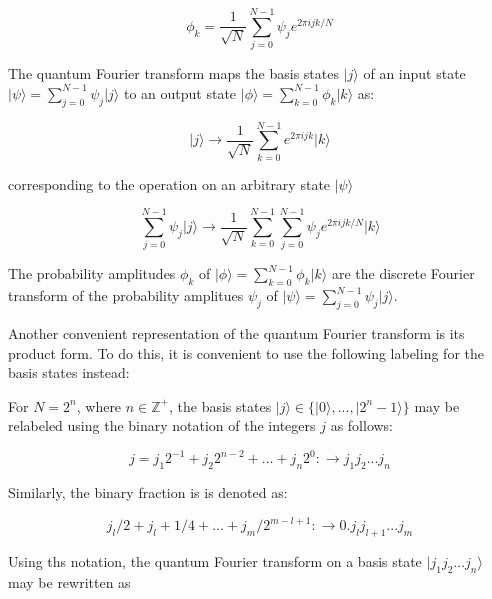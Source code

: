 \documentclass{article}
\begin{document}
\begin{equation}
\phi_k = \frac{1}{\sqrt{N}}  \sum_{j=0}^{N-1} \psi_j e^{2 \pi i j k / N }
\end{equation}

The quantum Fourier transform maps the basis states $\lvert j \rangle$ of an input state $\lvert \psi \rangle = \sum_{j=0}^{N-1} \psi_j \lvert j \rangle $ to an output state  $\lvert \phi \rangle = \sum_{k=0}^{N-1} \phi_k \lvert k \rangle $  as:

\begin{equation}
\lvert j \rangle \rightarrow \frac{1}{\sqrt{N}} \sum_{k=0}^{N-1} e^{2 \pi i j k } \lvert k \rangle
\end{equation}

corresponding to the operation on an arbitrary state $\lvert \psi \rangle$

\begin{equation}
\sum_{j=0}^{N-1} \psi_j \lvert j \rangle \rightarrow   \frac{1}{\sqrt{N}}  \sum_{k=0}^{N-1} \sum_{j=0}^{N-1} \psi_j e^{2 \pi i j k / N } |k\rangle
\end{equation}

The probability amplitudes $\phi_k$ of $ \lvert \phi \rangle = \sum_{k=0}^{N-1} \phi_k \lvert k \rangle$  are the discrete Fourier transform of the probability amplitues $\psi_j$ of $ \lvert \psi \rangle = \sum_{j=0}^{N-1} \psi_j \lvert j \rangle$.



Another convenient representation of the quantum Fourier transform is its product form. To do this, it is convenient to use the following labeling for the basis states instead:

For $N=2^n$, where $n\in \mathbb{Z}^+$, the basis states $ \lvert j \rangle \in \{ \lvert 0 \rangle , ... , \lvert 2^n - 1\rangle \}$  may be relabeled using the binary notation of the integers $j$ as follows:

\begin{equation}
j = j_1 2^{-1} + j_2 2^{n-2} + ... + j_n 2^{0} : \rightarrow j_1 j_2 ... j_n
\end{equation}

Similarly, the binary fraction is is denoted as:

\begin{equation}
j_l/2 + j_l+1/4 + ... + j_m/2^{m-l+1} : \rightarrow 0.j_l j_{l+1} ... j_m
\end{equation}


Using ths notation, the quantum Fourier transform on a basis state $\lvert j_1 j_2 ... j_n \rangle$ may be rewritten as 
\end{document}
